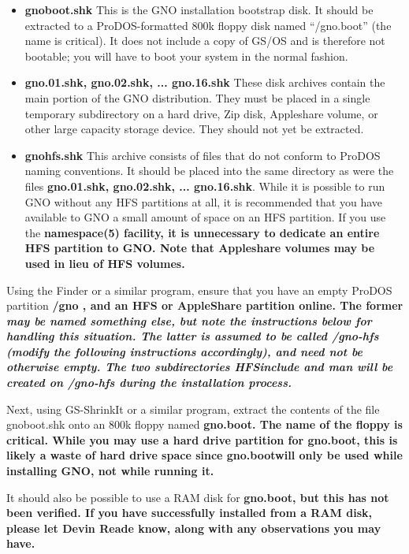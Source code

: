 \documentclass{report}
\begin{document}
\begin{itemize}

\item{\bf gnoboot.shk\rm}
This is the GNO installation bootstrap disk.  It should be extracted to
a ProDOS-formatted 800k floppy disk named ``/gno.boot'' (the name is
critical).  It does not include a copy of GS/OS and is
therefore not bootable; you will have to boot your system in the normal
fashion.

\item{\bf gno.01.shk\rm, \bf gno.02.shk\rm, ... \bf gno.16.shk\rm}
These disk archives contain the main portion of the GNO distribution.
They must be placed in a single temporary subdirectory on a hard drive,
Zip disk, Appleshare volume, or other large capacity storage device.
They should not yet be extracted.

\item{\bf gnohfs.shk\rm}
This archive consists of files that do not conform to ProDOS naming 
conventions.
It should be placed into the same directory as were the files
{\bf gno.01.shk\rm, \bf gno.02.shk\rm, ... \bf gno.16.shk\rm}.
While it is possible to run GNO without any HFS partitions
at all, it is recommended that you have available to GNO a small amount
of space on an HFS partition.  If you use the \bf namespace\rm(5) facility,
it is unnecessary to dedicate an entire HFS partition to GNO.
Note that Appleshare volumes may be used in lieu of HFS volumes.

\end{itemize}

Using the Finder or a similar program, ensure that you have an empty ProDOS 
partition \bf /gno \rm, and an HFS or AppleShare partition online.  The
former \em may \rm  be named something else, but note the instructions
below for handling this situation.  The latter is assumed to be called
\bf /gno-hfs \rm  (modify the following instructions accordingly), and
need not be otherwise empty.  The two subdirectories \bf HFSinclude \rm
and \bf man \rm  will be created on \bf /gno-hfs  \rm during the installation
process.

Next, using GS-ShrinkIt or a similar program, extract the contents of the
file gnoboot.shk onto an 800k floppy named \bf gno.boot\rm.  
The name of the floppy is critical.  While you may use a hard drive 
partition for \bf gno.boot\rm, this is likely a waste of hard drive space
since \bf gno.boot\rm  will only be used while installing GNO, not while
running it.

It should also be possible to use a RAM disk for \bf gno.boot\rm, but
this has not been verified.  If you have successfully installed from a
RAM disk, please let Devin Reade know, along with any observations
you may have.
\end{document}
